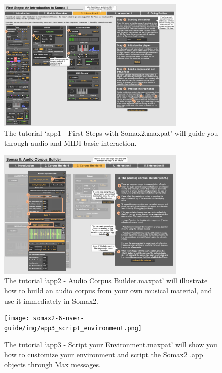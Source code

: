  \begin{figure}[H]
    \centering        
 	\includegraphics[width=0.8\textwidth]{img/app1_interaction.png}
    \caption{The tutorial `app1 - First Steps with Somax2.maxpat' will guide you through audio and MIDI basic interaction.}
    \label{fig:app1_interaction}
\end{figure}


 \begin{figure}[H]
    \centering        
 	\includegraphics[width=0.8\textwidth]{img/app2_audiocorpusbuilder.png}
    \caption{The tutorial `app2 - Audio Corpus Builder.maxpat' will illustrate how to build an audio corpus from your own musical material, and use it immediately in Somax2.}
    \label{fig:app2_audiocorpusbuilder}
\end{figure}

 \begin{figure}[H]
    \centering        
 	\texttt{[image: somax2-6-user-guide/img/app3\_script\_environment.png]}
    \caption{The tutorial `app3 - Script your Environment.maxpat' will show you how to customize your environment and script the Somax2 .app objects through Max messages.}
    \label{fig:app3_scrito}
\end{figure}



